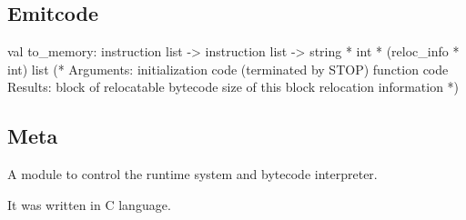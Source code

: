 \subsection{Emitcode}

\begin{ocamlcode}
val to_memory: instruction list -> instruction list ->
                    string * int * (reloc_info * int) list
        (* Arguments:
             initialization code (terminated by STOP)
             function code
           Results:
             block of relocatable bytecode
             size of this block
             relocation information *)
\end{ocamlcode}


\subsection{Meta}

A module to control the runtime system and bytecode interpreter.

It was written in C language.
